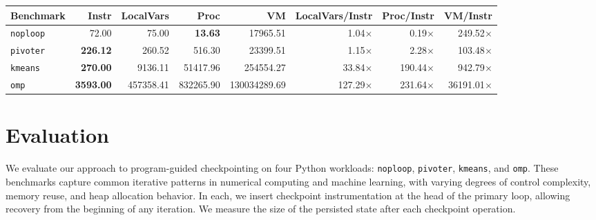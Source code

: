 

\newcommand{\VMDIFF}[0]{\textDelta VM}
\newcommand{\PROCDIFF}[0]{\textDelta Proc}


\begin{table*}
\centering
\begin{tabular}{lrrrr|rrr}
\toprule
\textbf{Benchmark} & \textbf{Instr} & \textbf{LocalVars} & \textbf{\PROCDIFF} & \textbf{\VMDIFF} & \textbf{LocalVars/Instr} & \textbf{\PROCDIFF/Instr} & \textbf{\VMDIFF/Instr} \\
\midrule
\texttt{noploop} & 72.00 & 75.00         & \textbf{13.63} & 17965.51
                         & 1.04$\times$  & 0.19$\times$   & 249.52$\times$ \\
\texttt{pivoter} &\textbf{226.12} & 260.52       & 516.30        & 23399.51
                                  & 1.15$\times$ & 2.28$\times$  & 103.48$\times$ \\
\texttt{kmeans} & \textbf{270.00} & 9136.11       & 51417.96       & 254554.27
                                  & 33.84$\times$ & 190.44$\times$ & 942.79$\times$  \\
\texttt{omp} & \textbf{3593.00} & 457358.41      & 832265.90      & 130034289.69 
                                & 127.29$\times$ & 231.64$\times$ &	36191.01$\times$  \\
\bottomrule
\end{tabular}
\caption{Average checkpoint sizes (in bytes) across filtered iterations. "Instr" refers to the instrumented version produced by our static analysis-based checkpointing. "\PROCDIFF" and "\VMDIFF" refer to memory diffs at the process and virtual machine levels respectively.}
\label{tab:checkpoint-sizes}
\end{table*}

\begin{figure*}
    \centering
    
\end{figure*}

\section{Evaluation}
\label{sec:evaluation}
We evaluate our approach to program-guided checkpointing on four Python workloads: \texttt{noploop}, \texttt{pivoter}, \texttt{kmeans}, and \texttt{omp}. These benchmarks capture common iterative patterns in numerical computing and machine learning, with varying degrees of control complexity, memory reuse, and heap allocation behavior. In each, we insert checkpoint instrumentation at the head of the primary loop, allowing recovery from the beginning of any iteration. We measure the size of the persisted state after each checkpoint operation.

